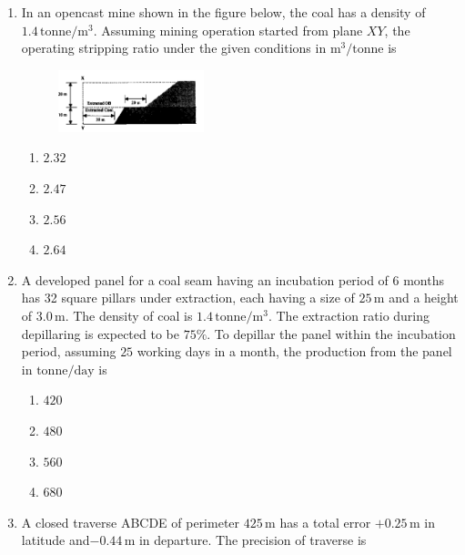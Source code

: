 \documentclass[journal,12pt,onecolumn]{IEEEtran}
\theoremstyle{remark}
\begin{document}
\begin{enumerate}
\item In an opencast mine shown in the figure below, the coal has a density of $1.4\, \mathrm{tonne}/\mathrm{m}^3$. Assuming
mining operation started from plane $XY$, the operating stripping ratio under the given conditions in 
$\mathrm{m^3}/\mathrm{tonne}$ is

\hfill{}
\begin{figure}[H]
\centering
\includegraphics[width=0.4\textwidth]{figs/37.png}
\end{figure}
\begin{multicols}{4}
\begin{enumerate}
\item $ 2.32$
\item $ 2.47$
\item $ 2.56$
\item $ 2.64$
\end{enumerate}
\end{multicols}

\item A developed panel for a coal seam having an incubation period of 6 months has 32 square pillars 
under extraction, each having a size of $25\,\mathrm{m}$ and a height of $3.0\,\mathrm{m}$. 
The density of coal is $1.4\,\mathrm{tonne/m^3}$. The extraction ratio during depillaring is expected to be $75\%$. 
To depillar the panel within the incubation period, assuming $25$ working days in a month, the production from  the panel in $\mathrm{tonne/day}$ is

\hfill{}
\begin{multicols}{4}
\begin{enumerate}
\item $420$
\item $480$
\item $560$
\item $680$
\end{enumerate}
\end{multicols}

\item A closed traverse ABCDE of perimeter $425\,\mathrm{m}$ has a total error $+0.25\,\mathrm{m}$ in latitude and$-0.44\,\mathrm{m}$ in departure. The precision of traverse is


\end{enumerate}
\end{document}
